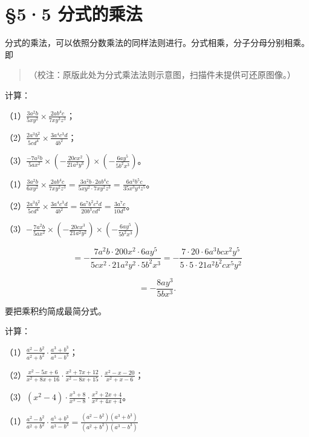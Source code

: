 \section{§5·5 分式的乘法}

分式的乘法，可以依照分数乘法的同样法则进行。分式相乘，分子分母分别相乘。即

\begin{quote}
（校注：原版此处为分式乘法法则示意图，扫描件未提供可还原图像。）
\end{quote}

 计算：

（1）\(\frac{3a^2b}{5xy^2} \times \frac{2ab^4c}{7xy^3z^3}\)；

（2）\(\frac{2a^3b^2}{5cd^4} \times \frac{3a^4c^3d}{4b^2}\)；

（3）\(\frac{-7a^2b}{5ax^2} \times \left(-\frac{20cx^2}{21a^2y^3}\right) \times \left(-\frac{6ay^5}{5b^2x^3}\right)\)。

（1）\(\frac{3a^2b}{6xy^2} \times \frac{2ab^4c}{7xy^2z^3} = \frac{3a^2b \cdot 2ab^4c}{5xy^2 \cdot 7xy^2z^3} = \frac{6a^3b^5c}{35x^3y^4z^5}\)。

（2）\(\frac{2a^3b^2}{5cd^4} \times \frac{3a^4c^3d}{4b^2} = \frac{6a^7b^2c^2d}{20b^3cd^4} = \frac{3a^7c}{10d^3}\)。

（3）\(-\frac{7a^2b}{5ax^2} \times \left(-\frac{20cx^3}{21a^2y^2}\right) \times \left(-\frac{6ay^5}{5b^2x^3}\right)\)

\[
= - \frac{7 a ^{2} b \cdot 200 x ^{2} \cdot 6 a y ^{5}}{5 c x ^{2} \cdot 21 a ^{2} y ^{2} \cdot 5 b ^{2} x ^{3}} = - \frac{7 \cdot 20 \cdot 6 a ^{3} b c x ^{2} y ^{5}}{5 \cdot 5 \cdot 21 a ^{2} b ^{2} c x ^{5} y ^{2}}
\]

\[
= - \frac{8 a y ^{3}}{5 b x ^{3}}.
\]

 要把乘积约简成最简分式。

 计算：

（1）\(\frac{a^2 - b^2}{a^2 + b^2} \cdot \frac{a^3 + b^3}{a^3 - b^3}\)；

（2）\(\frac{x^2 - 5x + 6}{x^2 + 8x + 16} \cdot \frac{x^2 + 7x + 12}{x^2 - 8x + 15} \cdot \frac{x^2 - x - 20}{x^2 + x - 6}\)；

（3）\((x^{2} - 4) \cdot \frac{x^{3} + 8}{x^{3} - 8} \cdot \frac{x^{2} + 2x + 4}{x^{2} + 4x + 4}\)。

（1）\(\frac{a^2 - b^2}{a^2 + b^2} \cdot \frac{a^5 + b^3}{a^3 - b^3} = \frac{(a^2 - b^2)(a^3 + b^3)}{(a^2 + b^2)(a^3 - b^3)}\)

